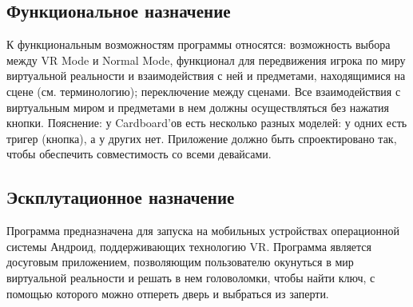 \subsection{Функциональное назначение}
\tab[0.75cm]К функциональным возможностям программы относятся: возможность 
выбора между VR 
Mode и Normal Mode, функционал для передвижения игрока по миру виртуальной 
реальности и взаимодействия с ней и предметами, находящимися на сцене (см. 
терминологию); переключение между сценами. Все взаимодействия с виртуальным 
миром и предметами в нем должны осуществляться без нажатия кнопки. Пояснение: у 
Cardboard'ов есть несколько разных моделей: у одних есть тригер (кнопка), а у 
других нет. Приложение должно быть спроектировано так, чтобы обеспечить 
совместимость со всеми девайсами. 

\subsection{Эскплутационное назначение}
\tab[0.75cm]Программа предназначена для запуска на мобильных устройствах 
операционной 
системы Андроид, поддерживающих технологию VR. Программа является досуговым 
приложением, позволяющим пользователю окунуться в мир виртуальной реальности и 
решать в нем головоломки, чтобы найти ключ, с помощью которого можно отпереть 
дверь и выбраться из заперти.